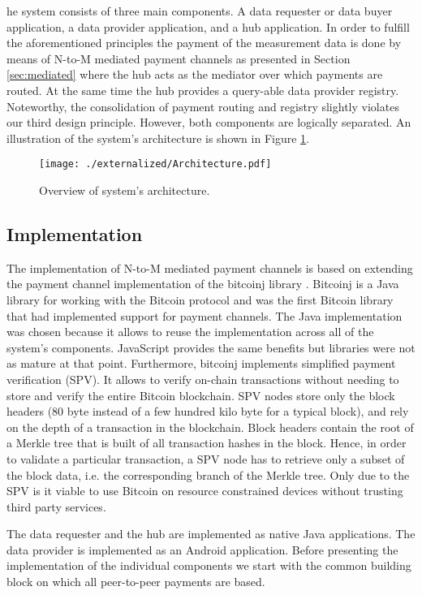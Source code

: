 he system consists of three main components. A data requester or data buyer application, a data provider application, and a hub application. In order to fulfill the aforementioned principles the payment of the measurement data is done by means of N-to-M mediated payment channels as presented in Section \ref{sec:mediated} where the hub acts as the mediator over which payments are routed. At the same time the hub provides a query-able data provider registry. Noteworthy, the consolidation of payment routing and registry slightly violates our third design principle. However, both components are logically separated. An illustration of the system's architecture is shown in Figure \ref{fig:architecture}.


 \begin{figure}
 \texttt{[image: ./externalized/Architecture.pdf]}
 \caption{Overview of system's architecture.}
 \label{fig:architecture}
 \end{figure}

\subsection{Implementation}

The implementation of N-to-M mediated payment channels is based on extending the payment channel implementation of the bitcoinj library \cite{Bitcoinj}. Bitcoinj is a Java library for working with the Bitcoin protocol and was the first Bitcoin library that had implemented support for payment channels. The Java implementation was chosen because it allows to reuse the implementation across all of the system's components. JavaScript provides the same benefits but libraries were not as mature at that point. Furthermore, bitcoinj implements simplified payment verification (SPV). It allows to verify on-chain transactions without needing to store and verify the entire Bitcoin blockchain. SPV nodes store only the block headers (80 byte instead of a few hundred kilo byte for a typical block), and rely on the depth of a transaction in the blockchain. Block headers contain the root of a Merkle tree that is built of all transaction hashes in the block. Hence, in order to validate a particular transaction, a SPV node has to retrieve only a subset of the block data, i.e. the corresponding branch of the Merkle tree.
Only due to the SPV is it viable to use Bitcoin on resource constrained devices without trusting third party services.

The data requester and the hub are implemented as native Java applications. The data provider is implemented as an Android application. Before presenting the implementation of the individual components we start with the common building block on which all peer-to-peer payments are based. 

